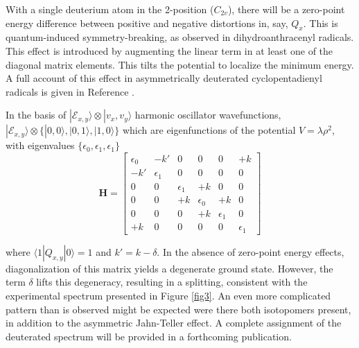 \documentclass[journal=jacsat,manuscript=article,layout=onecolumn]{achemso}
\begin{document}
With a single deuterium atom in the 2-position ($C_{2v}$), there will be a zero-point energy difference between positive and negative distortions in, say, $Q_x$. This is quantum-induced symmetry-breaking, as observed in dihydroanthracenyl radicals.\cite{kre19} This effect is introduced by augmenting the linear term in at least one of the diagonal matrix elements. This tilts the potential to localize the minimum energy.\cite{lia93} A full account of this effect in asymmetrically deuterated cyclopentadienyl radicals is given in Reference .

In the basis of $|\mathcal{E}_{x,y}\rangle\otimes|v_x,v_y\rangle$ harmonic oscillator wavefunctions, $|\mathcal{E}_{x,y}\rangle\otimes\{|0,0\rangle, |0,1\rangle, |1,0\rangle\}$ which are eigenfunctions of the potential $V = \lambda \rho^2$, with eigenvalues $\{\epsilon_0,\epsilon_1,\epsilon_1\}$
\begin{equation}\label{JT2}
  \mathbf{H} = \left[\begin{array}{cccccc}
                      \epsilon_0 & -k' & 0 & 0 & 0 & +k\\
                      -k' & \epsilon_1 & 0 & 0 & 0 & 0 \\
                      0 & 0 & \epsilon_1 & +k & 0 & 0 \\
                      0 & 0 & +k & \epsilon_0 & +k & 0\\
                      0 & 0 & 0 & +k & \epsilon_1 & 0\\
                      +k & 0 & 0 & 0 & 0 & \epsilon_1 
                     \end{array}
    \right]
\end{equation}

where $\langle1|Q_{x,y}|0\rangle=1$ and $k'=k-\delta$. In the absence of zero-point energy effects, diagonalization of this matrix yields a degenerate ground state. However, the term $\delta$ lifts this degeneracy, resulting in a splitting, consistent with the experimental spectrum presented in Figure \ref{fig3}. An even more complicated pattern than is observed might be expected were there both isotopomers present, in addition to the asymmetric Jahn-Teller effect. A complete assignment of the deuterated spectrum will be provided in a forthcoming publication.
\end{document}
